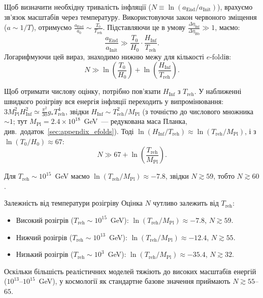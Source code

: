Щоб визначити необхідну тривалість інфляції ($N \equiv \ln(a_{\text{End}}/a_{\text{Init}})$),
врахуємо зв'язок масштабів через температуру.
Використовуючи закон червоного зміщення ($a \sim 1/T$),
отримуємо $\frac{a_{\text{End}}}{a_0} \sim \frac{T_0}{T_{\text{reh}}}$.
Підставляючи це в умову $\frac{\Delta\eta_{\text{Inf}}}{\Delta\eta_{\text{Bb}}} \gg 1$, маємо:
\begin{equation*}
	\frac{a_{\text{End}}}{a_{\text{Init}}} \gg \frac{T_0}{H_0} \cdot \frac{H_{\text{Inf}}}{T_{\text{reh}}}.
\end{equation*}
Логарифмуючи цей вираз, знаходимо нижню межу для кількості $e$-foldів:
\begin{equation*}
	N \gg \ln \left( \frac{T_0}{H_0} \right) + \ln \left( \frac{H_{\text{Inf}}}{T_{\text{reh}}} \right).
\end{equation*}

Щоб отримати числову оцінку, потрібно пов'язати $H_{\text{Inf}}$ з $T_{\text{reh}}$.
У наближенні швидкого розігріву вся енергія інфляції переходить у випромінювання:
$3M_{\text{Pl}}^2H_{\text{Inf}}^2 \simeq \frac{\pi^2}{30}g_*T_{\text{reh}}^4$, звідки
$H_{\text{Inf}} \sim T_{\text{reh}}^2/M_{\text{Pl}}$ (з точністю до числового множника ${\sim}1$;
тут $M_{\text{Pl}} = 2.4\times10^{18}$~GeV~--- редукована маса Планка, див.\ додаток~\ref{sec:appendix_efolds}). Тоді
$\ln(H_{\text{Inf}}/T_{\text{reh}}) \approx \ln(T_{\text{reh}}/M_{\text{Pl}})$, і з $\ln(T_0/H_0)\approx 67$:
\begin{equation*}
	N \gg 67 + \ln\left(\frac{T_{\text{reh}}}{M_{\text{Pl}}}\right).
\end{equation*}

Для $T_{\text{reh}} \sim 10^{15}$~GeV маємо
$\ln(T_{\text{reh}}/M_{\text{Pl}}) \approx -7.8$, звідки $N \gtrsim 59$,
тобто $N \gtrsim 60$.

\begin{keybox}{Залежність від температури розігріву}
	Оцінка $N$ чутливо залежить від $T_{\text{reh}}$:
	\begin{itemize}
		\item Високий розігрів ($T_{\text{reh}} \sim 10^{15}$~GeV):
		      $\ln(T_{\text{reh}}/M_{\text{Pl}}) \approx -7.8$,
		      $N \gtrsim 59$.
		\item Нижчий розігрів ($T_{\text{reh}} \sim 10^{13}$~GeV):
		      $\ln(T_{\text{reh}}/M_{\text{Pl}}) \approx -12.4$,
		      $N \gtrsim 55$.
		\item Низький розігрів ($T_{\text{reh}} \sim 10^3$~GeV):
		      $\ln(T_{\text{reh}}/M_{\text{Pl}}) \approx -35.4$,
		      $N \gtrsim 32$.
	\end{itemize}
	Оскільки більшість реалістичних моделей тяжіють до високих
	масштабів енергій ($10^{13}$--$10^{15}$~GeV),
	у космології як стандартне базове значення приймають
	$N \gtrsim 55$--$65$.
\end{keybox}

